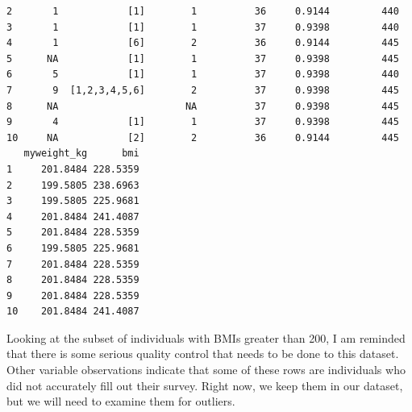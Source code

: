 \documentclass[
  letterpaper,
  DIV=11,
  numbers=noendperiod]{scrartcl}
\begin{document}
\begin{verbatim}
2       1            [1]        1          36     0.9144         440
3       1            [1]        1          37     0.9398         440
4       1            [6]        2          36     0.9144         445
5      NA            [1]        1          37     0.9398         445
6       5            [1]        1          37     0.9398         440
7       9  [1,2,3,4,5,6]        2          37     0.9398         445
8      NA                      NA          37     0.9398         445
9       4            [1]        1          37     0.9398         445
10     NA            [2]        2          36     0.9144         445
   myweight_kg      bmi
1     201.8484 228.5359
2     199.5805 238.6963
3     199.5805 225.9681
4     201.8484 241.4087
5     201.8484 228.5359
6     199.5805 225.9681
7     201.8484 228.5359
8     201.8484 228.5359
9     201.8484 228.5359
10    201.8484 241.4087
\end{verbatim}

Looking at the subset of individuals with BMIs greater than 200, I am
reminded that there is some serious quality control that needs to be
done to this dataset. Other variable observations indicate that some of
these rows are individuals who did not accurately fill out their survey.
Right now, we keep them in our dataset, but we will need to examine them
for outliers.
\end{document}
